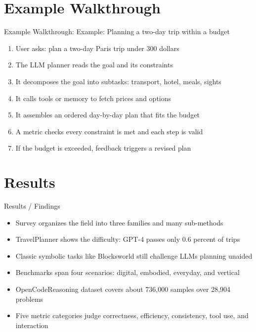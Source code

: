 \documentclass[10pt]{beamer}
\begin{document}
\section{Example Walkthrough}
\begin{frame}[allowframebreaks]{Example Walkthrough: Example: Planning a two-day trip within a budget}
\begin{enumerate}
  \item User asks: plan a two-day Paris trip under 300 dollars
  \item The LLM planner reads the goal and its constraints
  \item It decomposes the goal into subtasks: transport, hotel, meals, sights
  \item It calls tools or memory to fetch prices and options
  \item It assembles an ordered day-by-day plan that fits the budget
  \item A metric checks every constraint is met and each step is valid
  \item If the budget is exceeded, feedback triggers a revised plan
\end{enumerate}
\end{frame}
\section{Results}
\begin{frame}[allowframebreaks]{Results / Findings}
\begin{itemize}
  \item Survey organizes the field into three families and many sub-methods
  \item TravelPlanner shows the difficulty: GPT-4 passes only 0.6 percent of trips
  \item Classic symbolic tasks like Blocksworld still challenge LLMs planning unaided
  \item Benchmarks span four scenarios: digital, embodied, everyday, and vertical
  \item OpenCodeReasoning dataset covers about 736,000 samples over 28,904 problems
  \item Five metric categories judge correctness, efficiency, consistency, tool use, and interaction
\end{itemize}
\end{frame}
\end{document}
